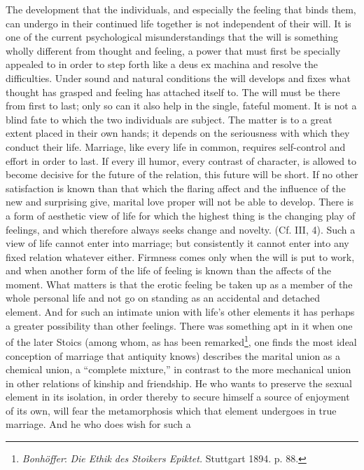 \documentclass[12pt,a4paper,openany]{book}
\newcommand{\opage}[1]{\marginnote{\footnotesize\textit{[#1]}}}
\begin{document}
The development that the individuals, and especially the feeling that binds them, can undergo in their continued life
together is not independent of their will. It is one of the current psychological misunderstandings that the will is
something wholly different from thought and feeling, a power that must first be specially appealed to in order to step
forth like a deus ex machina and resolve the difficulties. Under sound and natural conditions the will develops and
fixes what thought has grasped and feeling has attached itself to. The will must be there from first to last; only so
can it also help in the single, fateful moment. It is not a blind fate to which the two individuals are subject. The
matter is to a great extent placed in their own hands; it depends on the seriousness with which they conduct their
life. Marriage, like every life in common, requires self-control and effort in order to last. If every ill humor, every
contrast of character, is allowed to become decisive for the future of the relation, this future will be short. If no
other satisfaction is known than that which the flaring affect and the influence of the new and surprising give,
marital love proper will not be able to develop. There is a form of aesthetic view of life for which the highest thing
is the changing play of feelings, and which therefore always seeks change and novelty. (Cf. III, 4). Such a view of life
cannot enter into marriage; but consistently it cannot enter into any fixed relation whatever either. Firmness comes
only when the will is put to work, and when another form of the life of feeling is known than the affects of the
moment. What matters is that the erotic feeling be taken up as a member of the whole personal life and not go on
standing as an accidental and detached element. And for such an intimate union with life's other elements it has
perhaps a greater possibility than other feelings. There was something apt in it when one of the later Stoics (among
\opage{292}whom, as has been remarked\footnote[1]{\emph{Bonhöffer}: \textit{Die Ethik des Stoikers Epiktet.} Stuttgart 1894.
p. 88.}, one finds the most ideal conception of marriage that antiquity knows) describes the marital union as a chemical
union, a ``complete mixture,'' in contrast to the more mechanical union in other relations of kinship and friendship. He
who wants to preserve the sexual element in its isolation, in order thereby to secure himself a source of enjoyment of
its own, will fear the metamorphosis which that element undergoes in true marriage. And he who does wish for such a
\end{document}
